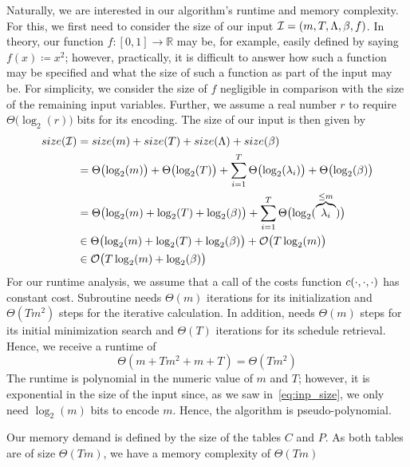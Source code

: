 Naturally, we are interested in our algorithm's runtime and memory complexity.
For this, we first need to consider the size of our input $\mathcal{I}=(m,T,\Lambda,\beta,f)$. In theory, our function $f:[0,1]\rightarrow \mathbb{R}$ may be, for example, easily defined by saying $f(x)\coloneqq x^2$; however, practically, it is difficult to answer how such a function may be specified and what the size of such a function as part of the input may be. For simplicity, we consider the size of $f$ negligible in comparison with the size of the remaining input variables. Further, we assume a real number $r$ to require $\Theta\bigl(\log_2(r)\bigr)$ bits for its encoding. The size of our input is then given by
\begin{align}
	size(\mathcal{I})&=size(m)+size(T)+size(\Lambda)+size(\beta)\nonumber\\
	&=\Theta\bigl(\log_2(m)\bigr)+\Theta\bigl(\log_2(T)\bigr)+\sum\limits_{i=1}^T \Theta\bigl(\log_2(\lambda_i)\bigr)+\Theta\bigl(\log_2(\beta)\bigr)\nonumber\\
	&=\Theta\bigl(\log_2(m)+\log_2(T)+\log_2(\beta)\bigr)+\sum\limits_{i=1}^T \Theta\bigl(\log_2(\overbrace{\lambda_i}^{\le m})\bigr)\nonumber\\
	&\in\Theta\bigl(\log_2(m)+\log_2(T)+\log_2(\beta)\bigr)+\mathcal{O}\bigl(T\log_2(m)\bigr)\nonumber\\
	&\in\mathcal{O}\bigl(T\log_2(m)+\log_2(\beta)\bigr)\label{eq:inp_size}
\end{align}
For our runtime analysis, we assume that a call of the costs function $c(\cdot,\cdot,\cdot)$ has constant cost. Subroutine  needs $\Theta(m)$ iterations for its initialization and $\Theta(Tm^2)$ steps for the iterative calculation. In addition,  needs $\Theta(m)$ steps for its initial minimization search and $\Theta(T)$ iterations for its schedule retrieval. Hence, we receive a runtime of 
\begin{equation*}
	\Theta(m+Tm^2+m+T)=\Theta(Tm^2)
\end{equation*}
The runtime is polynomial in the numeric value of $m$ and $T$; however, it is exponential in the size of the input since, as we saw in~\eqref{eq:inp_size}, we only need $\log_2(m)$ bits to encode $m$. Hence, the algorithm is pseudo-polynomial.

Our memory demand is defined by the size of the tables $C$ and $P$. As both tables are of size $\Theta(Tm)$, we have a memory complexity of $\Theta(Tm)$

